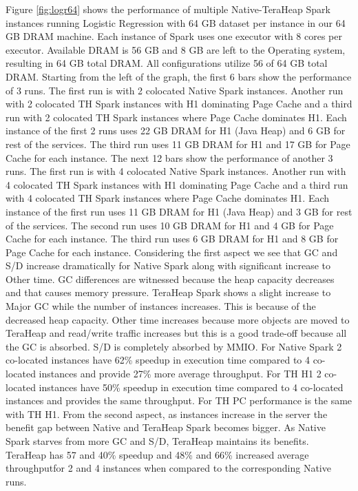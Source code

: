 Figure \ref{fig:logr64} shows the performance of multiple
Native-TeraHeap Spark instances running Logistic Regression with 64 GB
dataset per instance in our 64 GB DRAM machine. Each instance of Spark
uses one executor with 8 cores per executor. Available DRAM is 56 GB
and 8 GB are left to the Operating system, resulting in 64 GB total
DRAM. All configurations utilize 56 of 64 GB total DRAM.
Starting from the left of the graph, the first 6 bars show the
performance of 3 runs. The first run is with 2 colocated Native Spark instances.
Another run with 2 colocated TH Spark instances with H1 dominating Page Cache
and a third run with 2 colocated TH Spark instances where Page Cache dominates H1.
Each instance of the first 2 runs uses 22 GB DRAM for H1 (Java Heap) and 6 GB for rest of the services.
The third run uses 11 GB DRAM for H1 and 17 GB for Page Cache for each instance. 
The next 12 bars show the performance of another 3 runs. The first run is with 4 colocated Native Spark instances.
Another run with 4 colocated TH Spark instances with H1 dominating Page Cache
and a third run with 4 colocated TH Spark instances where Page Cache dominates H1.
Each instance of the first run uses 11 GB DRAM for H1 (Java Heap) and 3 GB for rest of the services.
The second run uses 10 GB DRAM for H1 and 4 GB for Page Cache for each instance.
The third run uses 6 GB DRAM for H1 and 8 GB for Page Cache for each instance.
Considering the first aspect we see that GC and S/D increase dramatically for Native Spark along with significant increase to Other time. GC differences are witnessed because the heap capacity decreases and that causes memory pressure. TeraHeap Spark shows a slight increase to Major GC while the number of instances increases. This is because of the decreased heap capacity. Other time increases because more objects are moved to TeraHeap and read/write traffic increases but this is a good trade-off because all the GC is absorbed. S/D is completely absorbed by MMIO. For Native Spark 2 co-located instances have 62\% speedup in execution time compared to 4 co-located instances and provide 27\% more average throughput. For TH H1 2 co-located instances have 50\% speedup in execution time compared to 4 co-located instances and provides the same throughput. For TH PC performance is the same with TH H1. From the second aspect, as instances increase in the server the benefit gap between Native and TeraHeap Spark becomes bigger. As Native Spark starves from more GC and S/D, TeraHeap maintains its benefits. TeraHeap has 57 and 40\% speedup and 48\% and 66\% increased average throughputfor 2 and 4 instances when compared to the corresponding Native runs.

